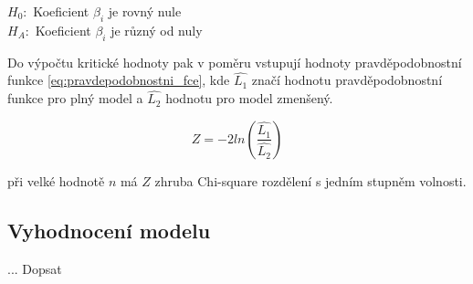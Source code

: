 $H_0:$ Koeficient $\beta_i$ je rovný nule \\
$H_A:$ Koeficient $\beta_i$ je různý od nuly

Do výpočtu kritické hodnoty pak v poměru vstupují hodnoty pravděpodobnostní funkce \ref{eq:pravdepodobnostni_fce}, kde 
$\hat{L_1}$ značí hodnotu pravděpodobnostní funkce pro plný model a $\hat{L_2}$ hodnotu pro model zmenšený.

\begin{equation}
    Z = -2ln(\frac{\hat{L_1}}{\hat{L_2}})
\end{equation}

při velké hodnotě $n$ má $Z$ zhruba Chi-square rozdělení s jedním stupněm volnosti.

\subsection{Vyhodnocení modelu}
... Dopsat